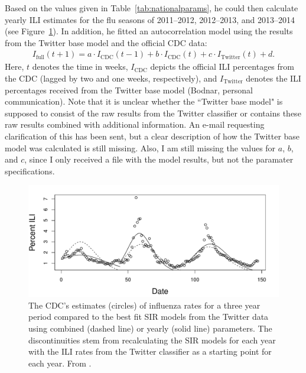 \documentclass[11pt, a4paper,twoside]{report}\usepackage[]{graphicx}\usepackage[]{color}
\begin{document}
Based on the values given in Table~\ref{tab:nationalparams}, he could then calculate yearly ILI estimates for the flu seasons of 2011--2012, 2012--2013, and 2013--2014 (see Figure~\ref{fig:cdc_fit_bodnar_thesis_SIR}). In addition, he fitted an autocorrelation model using the results from the Twitter base model and the official CDC data: 
  \begin{align}
I_{\text{full}}(t + 1) = a \cdot I_{\text{CDC}}(t - 1) + b \cdot I_{\text{CDC}}(t) + c \cdot I_{\text{Twitter}}(t) + d. \label{eq:2}
  \end{align}
Here, $t$ denotes the time in weeks, $I_{\text{CDC}}$ depicts the official ILI percentages from the CDC (lagged by two and one weeks, respectively), and $I_{\text{Twitter}}$ denotes the ILI percentages received from the Twitter base model (Bodnar, personal communication). Note that it is unclear whether the ``Twitter base model" is supposed to consist of the raw results from the Twitter classifier or contains these raw results combined with additional information. An e-mail requesting clarification of this has been sent, but a clear description of how the Twitter base model was calculated is still missing. Also, I am still missing the values for $a$, $b$, and $c$, since I only received a file with the model results, but not the paramater specifications.

\begin{figure}[H]
  \centering
    \includegraphics[width=1\textwidth]{02_todd_bodnar_SIR.png}
  \caption{The CDC's estimates (circles) of influenza rates for a three year period compared to the best fit SIR models from the Twitter data using combined (dashed line) or yearly (solid line) parameters. The discontinuities stem from recalculating the SIR models for each year with the ILI rates from the Twitter classifier as a starting point for each year. From \cite{bodnar_data_2015}.}
  \label{fig:cdc_fit_bodnar_thesis_SIR}
  \end{figure}
\end{document}
